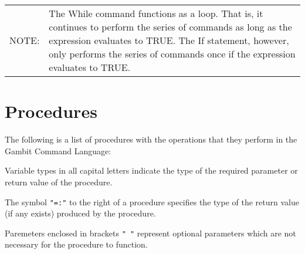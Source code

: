 \begin{tabular}{lp{4in}}
NOTE: & The While command functions as a loop.  That is, it continues
to perform the series of commands as long as the expression
evaluates to TRUE.  The If statement, however, only performs the
series of commands once if the expression evaluates to TRUE.\\
\end{tabular}

\section*{Procedures}

The following is a list of procedures with the operations that they perform
in the Gambit Command Language:

Variable types in all capital letters indicate the type of the required
parameter or return value of the procedure.

The symbol {\tt "=:"} to the right of a procedure specifies the type of the 
return value (if any exists) produced by the procedure.

Paremeters enclosed in brackets {\tt "{ }"} represent optional parameters which
are not necessary for the procedure to function.

